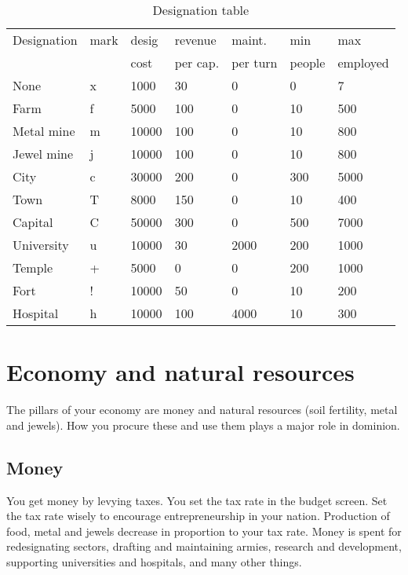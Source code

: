 \begin{same}
\begin{table}[hbpt]
\caption{Designation table}
\label{tab-designations}
\begin{tabular}{ || l | l | l | l | l | l | l || }
\hline
Designation &mark&desig& revenue & maint. & min  &  max    \\
            &    & cost & per cap.&per turn&people&employed \\
\hline
None        &  x & 1000 &   30    &    0   &    0 &    7 \\
Farm        &  f & 5000 &  100    &    0   &   10 &  500 \\
Metal mine  &  m &10000 &  100    &    0   &   10 &  800 \\
Jewel mine  &  j &10000 &  100    &    0   &   10 &  800 \\
City        &  c &30000 &  200    &    0   &  300 & 5000 \\
Town        &  T & 8000 &  150    &    0   &   10 &  400 \\
Capital     &  C &50000 &  300    &    0   &  500 & 7000 \\
University  &  u &10000 &   30    & 2000   &  200 & 1000 \\
Temple      &  + & 5000 &    0    &    0   &  200 & 1000 \\
Fort        &  ! &10000 &   50    &    0   &   10 &  200 \\
Hospital    &  h &10000 &  100    & 4000   &   10 &  300 \\
\hline
\end{tabular}
\end{table}
\end{same}

\section{Economy and natural resources}

The pillars of your economy are money and natural resources (soil
fertility, metal and jewels).  How you procure these and use them
plays a major role in dominion.

\subsection{Money}
You get money by levying taxes.  You set the tax rate in the budget
screen.  Set the tax rate wisely to encourage entrepreneurship in your
nation. Production of food, metal and jewels decrease in proportion to
your tax rate.  Money is spent for redesignating sectors, drafting and
maintaining armies, research and development, supporting universities
and hospitals, and many other things.

